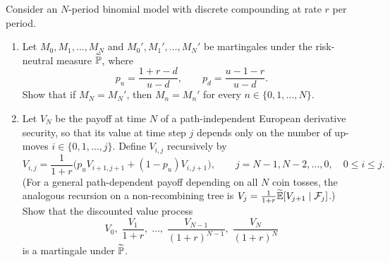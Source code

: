 \begin{problem}
    Consider an $N$-period binomial model with discrete compounding at rate $r$ per period.
    \begin{enumerate}
        \item Let $M_0, M_1, \ldots, M_N$ and $M_0', M_1', \ldots, M_N'$ be martingales under the risk-neutral measure $\widetilde{\mathbb{P}}$, where
        \[
        p_u = \frac{1 + r - d}{u - d}, \qquad p_d = \frac{u - 1 - r}{u - d}.
        \]
        Show that if $M_N = M_N'$, then $M_n = M_n'$ for every $n \in \{0, 1, \ldots, N\}$.
        \item Let $V_N$ be the payoff at time $N$ of a path-independent European derivative security, so that its value at time step $j$ depends only on the number of up-moves $i \in \{0, 1, \ldots, j\}$. Define $V_{i,j}$ recursively by
        \[
        V_{i,j} = \frac{1}{1+r}\bigl(p_u V_{i+1, j+1} + (1 - p_u) V_{i, j+1}\bigr), \qquad j = N-1, N-2, \ldots, 0,\quad 0 \leq i \leq j.
        \]
        (For a general path-dependent payoff depending on all $N$ coin tosses, the analogous recursion on a non-recombining tree is $V_j = \frac{1}{1+r}\widetilde{\mathbb{E}}[V_{j+1} \mid \mathcal{F}_j]$.) Show that the discounted value process
        \[
        V_0,\; \frac{V_1}{1+r},\; \ldots,\; \frac{V_{N-1}}{(1+r)^{N-1}},\; \frac{V_N}{(1+r)^N}
        \]
        is a martingale under $\widetilde{\mathbb{P}}$.
    \end{enumerate}
\end{problem}

